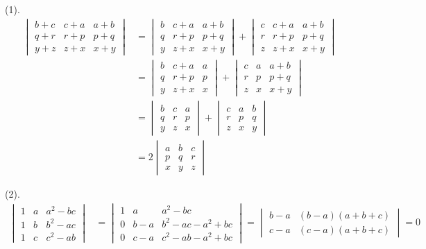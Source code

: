(1).
\begin{align*}
\begin{vmatrix} b+c & c+a & a+b \\ q+r & r+p & p+q \\ y+z & z+x & x+y \end{vmatrix} & = \begin{vmatrix} b & c+a & a+b \\ q & r+p & p+q \\ y & z+x & x+y \end{vmatrix} + \begin{vmatrix} c & c+a & a+b \\ r & r+p & p+q \\ z & z+x & x+y \end{vmatrix} \\
& = \begin{vmatrix} b & c+a & a \\ q & r+p & p \\ y & z+x & x \end{vmatrix} + \begin{vmatrix} c & a & a+b \\ r & p & p+q \\ z & x & x+y \end{vmatrix} \\
& = \begin{vmatrix} b & c & a \\ q & r & p \\ y & z & x \end{vmatrix} + \begin{vmatrix} c & a & b \\ r & p & q \\ z & x & y \end{vmatrix} \\
& = 2 \begin{vmatrix} a & b & c \\ p & q & r \\ x & y & z \end{vmatrix}
\end{align*}

(2).
\begin{align*}
\begin{vmatrix} 1 & a & a^2-bc \\ 1 & b & b^2-ac \\ 1 & c & c^2-ab \end{vmatrix} & = \begin{vmatrix} 1 & a & a^2-bc \\ 0 & b-a & b^2-ac-a^2+bc \\ 0 & c-a & c^2-ab-a^2+bc \end{vmatrix} = \begin{vmatrix} b-a & (b-a)(a+b+c) \\ c-a & (c-a)(a+b+c) \end{vmatrix} = 0
\end{align*}

